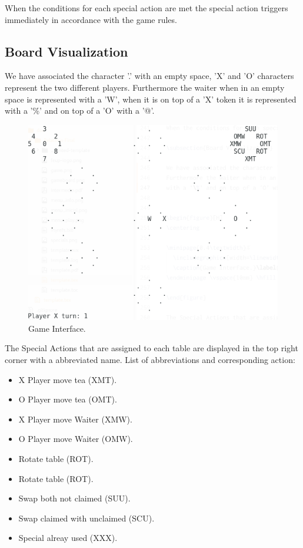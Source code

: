 \documentclass[a4paper]{article}
\begin{document}
When the conditions for each special action are met the special action triggers immediately in accordance with the game rules.

\subsection{Board Visualization}

We have associated the character '.' with an empty space, 'X' and 'O' characters represent the two different players.
Furthermore the waiter when in an empty space is represented with a 'W', when it is on top of a 'X' token it is represented
with a '\%' and on top of a 'O' with a '@'.


\begin{figure}[H]
\centering

%
  \includegraphics[width=\linewidth]{game.png}
  \caption{Game Interface.}\label{fig:game}
\endminipage \vspace{10mm} \hfill

\end{figure}

The Special Actions that are assigned to each table are displayed in the top right corner with a abbreviated name.
List of abbreviations and corresponding action: \vspace{1mm}

 \begin{itemize}
    \item X Player move tea (XMT).
    \item O Player move tea (OMT).
    \item X Player move Waiter (XMW).
    \item O Player move Waiter (OMW).
    \item Rotate table (ROT).
    \item Rotate table (ROT).
    \item Swap both not claimed (SUU).
    \item Swap claimed with unclaimed (SCU).
    \item Special alreay used (XXX).
\end{itemize}
\end{document}
